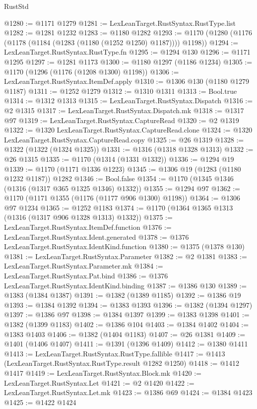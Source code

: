 \begin{lexlean}{RustStd}
\begin{coremodule}
@1280 := @1171 @1279
@1281 := LexLeanTarget.RustSyntax.RustType.list
@1282 := @1281 @1232
@1283 := @1180 @1282
@1293 := @1170 (@1280 (@1176 (@1178 (@1184 (@1283 (@1180 (@1252 @1250) @1187)))) @1198))
@1294 := LexLeanTarget.RustSyntax.RustType.fn
@1295 := @1294 @130
@1296 := @1171 @1295
@1297 := @1281 @1173
@1300 := @1180 @1297 (@1186 @1234)
@1305 := @1170 (@1296 (@1176 (@1208 @1300) @1198))
@1306 := LexLeanTarget.RustSyntax.ItemDef.apply
@1310 := @1306 @130 (@1180 @1279 @1187)
@1311 := @1252 @1279
@1312 := @1310 @1311
@1313 := Bool.true
@1314 := @1312 @1313
@1315 := LexLeanTarget.RustSyntax.Dispatch
@1316 := @2 @1315
@1317 := LexLeanTarget.RustSyntax.Dispatch.mk
@1318 := @1317 @97
@1319 := LexLeanTarget.RustSyntax.CaptureRead
@1320 := @2 @1319
@1322 := @1320 LexLeanTarget.RustSyntax.CaptureRead.clone
@1324 := @1320 LexLeanTarget.RustSyntax.CaptureRead.copy
@1325 := @26 @1319
@1328 := @1322 (@1322 (@1324 @1325))
@1331 := @1316 (@1318 @1328 @1313)
@1332 := @26 @1315
@1335 := @1170 (@1314 (@1331 @1332))
@1336 := @1294 @19
@1339 := @1170 (@1171 @1336 @1223)
@1345 := @1306 @19 (@1283 (@1180 @1232 @1187)) @1282
@1346 := Bool.false
@1354 := @1170 (@1345 @1346 (@1316 (@1317 @365 @1325 @1346) @1332))
@1355 := @1294 @97
@1362 := @1170 (@1171 @1355 (@1176 (@1177 @906 @1300) @1198))
@1364 := @1306 @97 @1234
@1365 := @1252 @1183
@1374 := @1170 (@1364 @1365 @1313 (@1316 (@1317 @906 @1328 @1313) @1332))
@1375 := LexLeanTarget.RustSyntax.ItemDef.function
@1376 := LexLeanTarget.RustSyntax.Ident.generated
@1378 := @1376 LexLeanTarget.RustSyntax.IdentKind.function
@1380 := @1375 (@1378 @130)
@1381 := LexLeanTarget.RustSyntax.Parameter
@1382 := @2 @1381
@1383 := LexLeanTarget.RustSyntax.Parameter.mk
@1384 := LexLeanTarget.RustSyntax.Pat.bind
@1386 := @1376 LexLeanTarget.RustSyntax.IdentKind.binding
@1387 := @1386 @130
@1389 := @1383 (@1384 @1387)
@1391 := @1382 (@1389 @1185)
@1392 := @1386 @19
@1393 := @1384 @1392
@1394 := @1383 @1393
@1396 := @1382 (@1394 @1297)
@1397 := @1386 @97
@1398 := @1384 @1397
@1399 := @1383 @1398
@1401 := @1382 (@1399 @1183)
@1402 := @1386 @104
@1403 := @1384 @1402
@1404 := @1383 @1403
@1406 := @1382 (@1404 @1183)
@1407 := @26 @1381
@1409 := @1401 (@1406 @1407)
@1411 := @1391 (@1396 @1409)
@1412 := @1380 @1411
@1413 := LexLeanTarget.RustSyntax.RustType.fallible
@1417 := @1413 (LexLeanTarget.RustSyntax.RustType.result @1282 @1250)
@1418 := @1412 @1417
@1419 := LexLeanTarget.RustSyntax.Block.mk
@1420 := LexLeanTarget.RustSyntax.Let
@1421 := @2 @1420
@1422 := LexLeanTarget.RustSyntax.Let.mk
@1423 := @1386 @69
@1424 := @1384 @1423
@1425 := @1422 @1424

\end{coremodule}
\end{lexlean}

